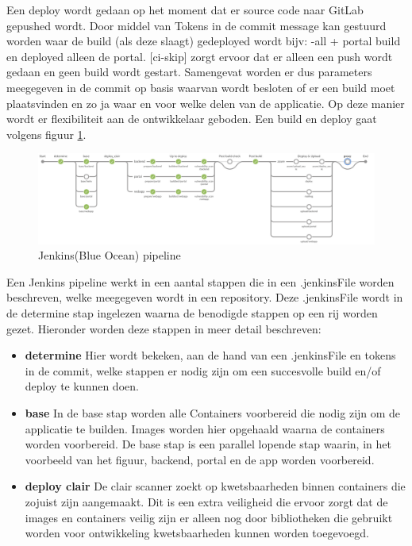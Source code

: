 \begin{itemize}
    Een deploy wordt gedaan op het moment dat er source code naar GitLab gepushed wordt. Door middel van Tokens in de commit message kan gestuurd worden waar de build (als deze slaagt) gedeployed wordt bijv: {-all + portal} build en deployed alleen de portal. [ci-skip] zorgt ervoor dat er alleen een push wordt gedaan en geen build wordt gestart.
    Samengevat worden er dus parameters meegegeven in de commit op basis waarvan wordt besloten of er een build moet plaatsvinden en zo ja waar en voor welke delen van de applicatie. Op deze manier wordt er flexibiliteit aan de ontwikkelaar geboden. Een build en deploy gaat volgens figuur \ref{fig:JenkinsPipeLine}.

    \begin{figure}
        \myfloatalign
        \includegraphics[width=12cm]{gfx/Screenshot 2021-08-18 Jenkins PipeLine}
        \caption{Jenkins(Blue Ocean) pipeline}
        \label{fig:JenkinsPipeLine}
    \end{figure}
    Een Jenkins pipeline werkt in een aantal stappen die in een .jenkinsFile worden beschreven, welke meegegeven wordt in een repository. Deze .jenkinsFile wordt in de determine stap ingelezen waarna de benodigde stappen op een rij worden gezet. Hieronder worden deze stappen in meer detail beschreven:
    \begin{itemize}
        \item \textbf{determine} Hier wordt bekeken, aan de hand van een .jenkinsFile en tokens in de commit, welke stappen er nodig zijn om een succesvolle build en/of deploy te kunnen doen.
        \item \textbf{base} In de base stap worden alle Containers voorbereid die nodig zijn om de applicatie te builden. Images worden hier opgehaald waarna de containers worden voorbereid. De base stap is een parallel lopende stap waarin, in het voorbeeld van het figuur, backend, portal en de app worden voorbereid.
        \item \textbf{deploy clair} De clair scanner zoekt op kwetsbaarheden binnen containers die zojuist zijn aangemaakt. Dit is een extra veiligheid die ervoor zorgt dat de images en containers veilig zijn er alleen nog door bibliotheken die gebruikt worden voor ontwikkeling kwetsbaarheden kunnen worden toegevoegd.

\end{itemize}
\end{itemize}
